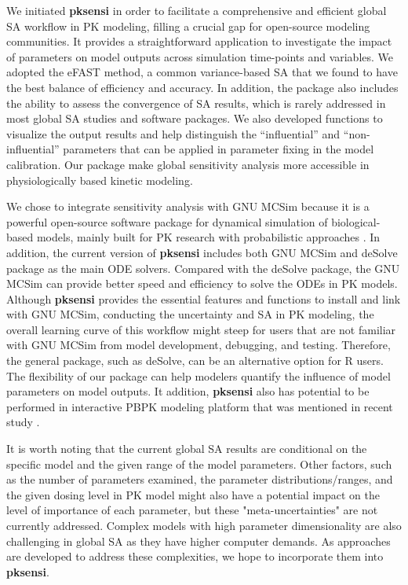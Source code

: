\documentclass[preprint,12pt, a4paper]{elsarticle}
\begin{document}
We initiated \textbf{pksensi} in order to facilitate a comprehensive
and efficient global SA workflow in PK modeling, filling a crucial gap
for open-source modeling communities. It provides a straightforward
application to investigate the impact of parameters on model outputs
across simulation time-points and variables. We adopted the eFAST
method, a common variance-based SA that we found to have the best
balance of efficiency and accuracy. In addition, the package also
includes the ability to assess the convergence of SA results, which is
rarely addressed in most global SA studies and software packages. We
also developed functions to visualize the output results and help
distinguish the ``influential'' and ``non-influential'' parameters that
can be applied in parameter fixing in the model calibration. 
Our package make global sensitivity analysis more accessible in physiologically based
kinetic modeling.

We chose to integrate sensitivity analysis with GNU MCSim because it is
a powerful open-source software package for dynamical simulation of
biological-based models, mainly built for PK research with probabilistic
approaches \cite{bois2009gnu}. In addition, the current version of
\textbf{pksensi} includes both GNU MCSim and deSolve package as the
main ODE solvers. Compared with the deSolve package, the GNU
MCSim can provide better speed and efficiency to solve the ODEs in PK
models. Although \textbf{pksensi} provides the essential features and
functions to install and link with GNU MCSim, conducting the uncertainty
and SA in PK modeling, the overall learning curve of this workflow might
steep for users that are not familiar with GNU MCSim from model
development, debugging, and testing. Therefore, the general package,
such as deSolve, can be an alternative option for R users.
The flexibility of our package can help modelers quantify the influence of
model parameters on model outputs.
It addition, \textbf{pksensi} also has potential to be performed in interactive PBPK
modeling platform that was mentioned in recent study \cite{li2019integration}.

It is worth noting that the current global SA results are conditional on the 
specific model and the given range of the model parameters. 
Other factors, such as the number of parameters examined, 
the parameter distributions/ranges, and the given dosing level in PK model 
might also have a potential impact on the level of importance of each parameter, 
but these "meta-uncertainties" are not currently addressed. Complex models with 
high parameter dimensionality are also challenging in global SA as they have 
higher computer demands. As approaches are developed to address these complexities, 
we hope to incorporate them into \textbf{pksensi}.
\end{document}
